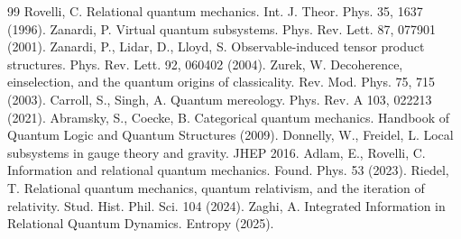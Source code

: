 \documentclass[11pt]{article}
\begin{document}
\begin{thebibliography}{99}
 Rovelli, C. Relational quantum mechanics. Int. J. Theor. Phys. 35, 1637 (1996).
 Zanardi, P. Virtual quantum subsystems. Phys. Rev. Lett. 87, 077901 (2001).
 Zanardi, P., Lidar, D., Lloyd, S. Observable-induced tensor product structures. Phys. Rev. Lett. 92, 060402 (2004).
 Zurek, W. Decoherence, einselection, and the quantum origins of classicality. Rev. Mod. Phys. 75, 715 (2003).
 Carroll, S., Singh, A. Quantum mereology. Phys. Rev. A 103, 022213 (2021).
 Abramsky, S., Coecke, B. Categorical quantum mechanics. Handbook of Quantum Logic and Quantum Structures (2009).
 Donnelly, W., Freidel, L. Local subsystems in gauge theory and gravity. JHEP 2016.
 Adlam, E., Rovelli, C. Information and relational quantum mechanics. Found. Phys. 53 (2023).
 Riedel, T. Relational quantum mechanics, quantum relativism, and the iteration of relativity. Stud. Hist. Phil. Sci. 104 (2024).
 Zaghi, A. Integrated Information in Relational Quantum Dynamics. Entropy (2025).
\end{thebibliography}
\end{document}
